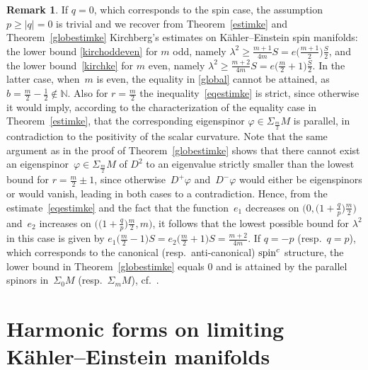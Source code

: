 \documentclass[pdftex]{sigma}
\numberwithin{equation}{section}
\theoremstyle{definition}
\newtheorem{Remark}[thm]{Remark}
\begin{document}
\begin{Remark}
If $q=0$, which corresponds to the spin case, the assumption $p \geq \vert q \vert = 0$ is trivial and we recover from Theorem~\ref{estimke} and Theorem~\ref{globestimke} Kirchberg's estimates on K\"ahler--Einstein spin manifolds: the lower bound \eqref{kirchoddeven} for $m$ odd, namely $\lambda^2\geq \frac{m+1}{4m}S=e\big(\frac{m+1}{2}\big)\frac{S}{2}$,  and the lower bound~\eqref{kirchke} for $m$ even, namely $\lambda^2\geq \frac{m+2}{4m}S=e\big(\frac{m}{2}+1\big)\frac{S}{2}$. In the latter case, when~$m$ is even, the equality in \eqref{global} cannot be attained, as $b=\frac{m}{2}-\frac{1}{2}\notin\mathbb{N}$. Also for $r=\frac{m}{2}$ the inequality~\eqref{eqestimke} is strict, since otherwise it would imply, according to the characterization of the equality case in Theorem~\ref{estimke}, that the corresponding eigenspinor $\varphi\in\Sigma_{\frac{m}{2}}M$ is parallel, in contradiction to the positivity of the scalar curvature. Note that the same argument as in the proof of Theorem~\ref{globestimke} shows that there cannot exist an eigenspinor~$\varphi\in \Sigma_{\frac{m}{2}}M$ of $D^2$ to an eigenvalue strictly smaller than the lowest bound for $r=\frac{m}{2}\pm 1$, since otherwise~$D^+\varphi$ and~$D^-\varphi$ would either be eigenspinors or would vanish, leading in both cases to a contradiction.
Hence, from the estimate~\eqref{eqestimke} and the fact that the function~$e_1$ decreases on $\big(0,\big(1+\frac{q}{p}\big)\frac{m}{2}\big)$
and~$e_2$ increases on $\big(\big(1+\frac{q}{p}\big)\frac{m}{2},m\big)$, it follows that the lowest possible bound for $\lambda^2$ in this case is given by $e_1\big(\frac{m}{2}-1\big)S=e_2\big(\frac{m}{2}+1\big)S=\frac{m+2}{4m}$. If $q=- p$ (resp.~$q = p$), which corresponds to the canonical (resp.\ anti-canonical) ${\mathop{\rm spin}^c}$ structure, the lower bound in Theorem~\ref{globestimke} equals $0$ and is attained by the parallel spinors in~$\Sigma_{0}M$ (resp.~$\Sigma_{m}M$),  cf.~\cite{Moro1}.
\end{Remark}

\section{Harmonic forms on limiting K\"ahler--Einstein manifolds}
\end{document}
